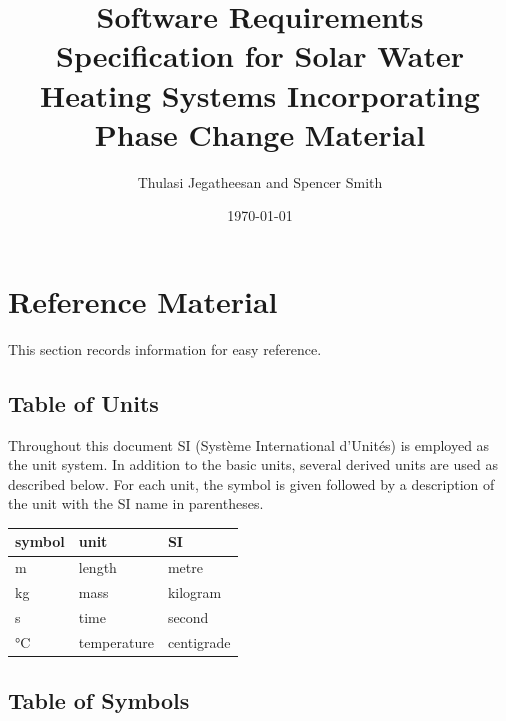 \documentclass[12pt]{article}
\begin{document}
\title{Software Requirements Specification for Solar Water Heating Systems
  Incorporating Phase Change Material} 
\author{Thulasi Jegatheesan and Spencer Smith}
\date{\today}
	
\maketitle

\tableofcontents

\section{Reference Material}

This section records information for easy reference.

\subsection{Table of Units}

Throughout this document SI (Syst\`{e}me International d'Unit\'{e}s) is employed
as the unit system.  In addition to the basic units, several derived units are
used as described below.  For each unit, the symbol is given followed by a
description of the unit with the SI name in parentheses.
~\newline

\renewcommand{\arraystretch}{1.2}
  \noindent \begin{tabular}{l l l} 
    \toprule		
    \textbf{symbol} & \textbf{unit} & \textbf{SI}\\
    \midrule 
    \si{\meter} & length & metre\\
    \si{\kilogram} & mass	& kilogram\\
    \si{\second} & time & second\\
    \si{\celsius} & temperature & centigrade\\
    \bottomrule
  \end{tabular}

\subsection{Table of Symbols}
\end{document}
